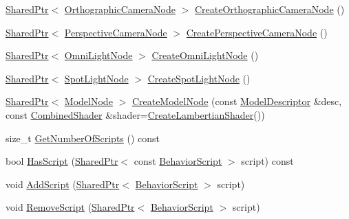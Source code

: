 \begin{DoxyCompactItemize}
\item 
\hyperlink{namespacemage_a1e01ae66713838a7a67d30e44c67703e}{Shared\+Ptr}$<$ \hyperlink{namespacemage_a2ba71e84d4a4fb1e4a7160800c53f519}{Orthographic\+Camera\+Node} $>$ \hyperlink{classmage_1_1_scene_a9ed9e3a611434f62427c7bd4c16d2456}{Create\+Orthographic\+Camera\+Node} ()
\item 
\hyperlink{namespacemage_a1e01ae66713838a7a67d30e44c67703e}{Shared\+Ptr}$<$ \hyperlink{namespacemage_af3a338f28772b91cf6d7cb85df6f4bb9}{Perspective\+Camera\+Node} $>$ \hyperlink{classmage_1_1_scene_a3f4141d407133e6419af92376bc3ecc1}{Create\+Perspective\+Camera\+Node} ()
\item 
\hyperlink{namespacemage_a1e01ae66713838a7a67d30e44c67703e}{Shared\+Ptr}$<$ \hyperlink{namespacemage_a85082c7e15a2bbf19b1753b7de6c45db}{Omni\+Light\+Node} $>$ \hyperlink{classmage_1_1_scene_a370f5ce63a6277a1369c1545f0acbffa}{Create\+Omni\+Light\+Node} ()
\item 
\hyperlink{namespacemage_a1e01ae66713838a7a67d30e44c67703e}{Shared\+Ptr}$<$ \hyperlink{namespacemage_a46c8f54b869a5dc07f520c600b9046bd}{Spot\+Light\+Node} $>$ \hyperlink{classmage_1_1_scene_a27ffb510eeb8e208ba20ee0d76138a3f}{Create\+Spot\+Light\+Node} ()
\item 
\hyperlink{namespacemage_a1e01ae66713838a7a67d30e44c67703e}{Shared\+Ptr}$<$ \hyperlink{classmage_1_1_model_node}{Model\+Node} $>$ \hyperlink{classmage_1_1_scene_a8ff21b5512cfbc053d96882a5d30996e}{Create\+Model\+Node} (const \hyperlink{classmage_1_1_model_descriptor}{Model\+Descriptor} \&desc, const \hyperlink{structmage_1_1_combined_shader}{Combined\+Shader} \&shader=\hyperlink{namespacemage_a91a20907d6a7a77bdd768dbd0bc420c5}{Create\+Lambertian\+Shader}())
\item 
size\+\_\+t \hyperlink{classmage_1_1_scene_a799ac8ddd90d24f6c3c208942e4f159c}{Get\+Number\+Of\+Scripts} () const
\item 
bool \hyperlink{classmage_1_1_scene_a9dd6c49e9db7590de1de4fbd128c78a9}{Has\+Script} (\hyperlink{namespacemage_a1e01ae66713838a7a67d30e44c67703e}{Shared\+Ptr}$<$ const \hyperlink{classmage_1_1_behavior_script}{Behavior\+Script} $>$ script) const
\item 
void \hyperlink{classmage_1_1_scene_ab97b66c81c32681699052e154d0e0722}{Add\+Script} (\hyperlink{namespacemage_a1e01ae66713838a7a67d30e44c67703e}{Shared\+Ptr}$<$ \hyperlink{classmage_1_1_behavior_script}{Behavior\+Script} $>$ script)
\item 
void \hyperlink{classmage_1_1_scene_a82705ba56543dea410439760b1667bc5}{Remove\+Script} (\hyperlink{namespacemage_a1e01ae66713838a7a67d30e44c67703e}{Shared\+Ptr}$<$ \hyperlink{classmage_1_1_behavior_script}{Behavior\+Script} $>$ script)

\end{DoxyCompactItemize}
